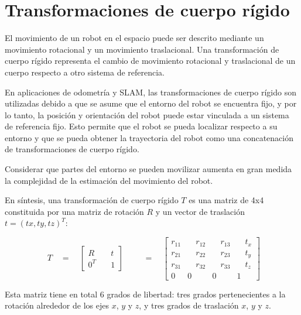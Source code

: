 \section{ Transformaciones de cuerpo rígido }

El movimiento de un robot en el espacio puede ser descrito mediante un movimiento rotacional y un movimiento traslacional. Una transformación de cuerpo rígido representa el cambio de movimiento rotacional y traslacional de un cuerpo respecto a otro sistema de referencia.

En aplicaciones de odometría y SLAM, las transformaciones de cuerpo rígido son utilizadas debido a que se asume que el entorno del robot se encuentra fijo, y por lo tanto, la posición y orientación del robot puede estar vinculada a un sistema de referencia fijo. Esto permite que el robot se pueda localizar respecto a su entorno y que se pueda obtener la trayectoria del robot como una concatenación de transformaciones de cuerpo rígido.

Considerar que partes del entorno se pueden movilizar aumenta en gran medida la complejidad de la estimación del movimiento del robot.

En síntesis, una transformación de cuerpo rígido $T$  es una matriz de 4x4 constituida por una matriz de rotación $R$ y un vector de traslación $t = {(tx, ty, tz)}^{T}$:

\begin{equation}
\begin{matrix} { { T } }\quad =\quad \begin{bmatrix} R & \quad { { t } } \\ { 0 }^{ T } & \quad 1 \end{bmatrix}\quad  \end{matrix}\quad =\quad \begin{bmatrix} { r }_{ 11 } & { \quad r }_{ 12 } & { \quad r }_{ 13 } & \quad t_{ x } \\ { r }_{ 21 } & { \quad r }_{ 22 } & { \quad r }_{ 23 } & { \quad t }_{ y } \\ { r }_{ 31 } & { \quad r }_{ 32 } & { \quad r }_{ 33 } & \quad { t }_{ z } \\ 0 & 0 & 0 & 1 \end{bmatrix}
\label{eq:TC}
\end{equation}

Esta matriz tiene en total 6 grados de libertad: tres grados pertenecientes a la rotación alrededor de los ejes $x$, $y$ y $z$, y tres grados de traslación $x$, $y$ y $z$. 

